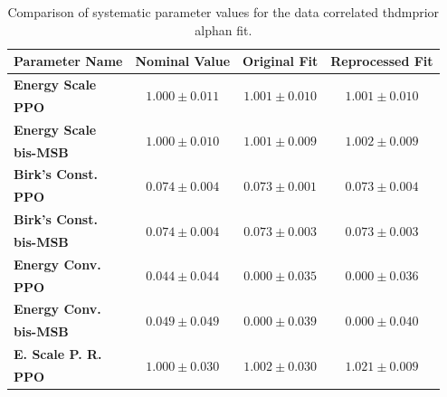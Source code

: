 \begin{table}
    \small
    \centering
    \caption{Comparison of systematic parameter values for the data correlated thdmprior alphan fit.}
    \label{tab:data_correlated_thdmprior_alphan_syst_old_new}
    \begin{tabular}{lccc}
        \hline\hline
        \textbf{Parameter Name} & \textbf{Nominal Value} & \textbf{Original Fit} & \textbf{Reprocessed Fit} \\
        \hline

        \textbf{Energy Scale} & \multirow{2}{*}{$1.000\pm0.011$} & \multirow{2}{*}{$1.001\pm0.010$} & \multirow{2}{*}{$1.001\pm0.010$} \\
        \textbf{PPO} & & & \\
        \hline

        \textbf{Energy Scale} & \multirow{2}{*}{$1.000\pm0.010$} & \multirow{2}{*}{$1.001\pm0.009$} & \multirow{2}{*}{$1.002\pm0.009$} \\
        \textbf{bis-MSB} & & & \\
        \hline

        \textbf{Birk's Const.} & \multirow{2}{*}{$0.074\pm0.004$} & \multirow{2}{*}{$0.073\pm0.001$} & \multirow{2}{*}{$0.073\pm0.004$} \\
        \textbf{PPO} & & & \\
        \hline

        \textbf{Birk's Const.} & \multirow{2}{*}{$0.074\pm0.004$} & \multirow{2}{*}{$0.073\pm0.003$} & \multirow{2}{*}{$0.073\pm0.003$} \\
        \textbf{bis-MSB} & & & \\
        \hline

        \textbf{Energy Conv.} & \multirow{2}{*}{$0.044\pm0.044$} & \multirow{2}{*}{$0.000\pm0.035$} & \multirow{2}{*}{$0.000\pm0.036$} \\
        \textbf{PPO} & & & \\
        \hline

        \textbf{Energy Conv.} & \multirow{2}{*}{$0.049\pm0.049$} & \multirow{2}{*}{$0.000\pm0.039$} & \multirow{2}{*}{$0.000\pm0.040$} \\
        \textbf{bis-MSB} & & & \\
        \hline

        \textbf{E. Scale P. R.} & \multirow{2}{*}{$1.000\pm0.030$} & \multirow{2}{*}{$1.002\pm0.030$} & \multirow{2}{*}{$1.021\pm0.009$} \\
        \textbf{PPO} & & & \\
        \hline


\end{tabular}
\end{table}
